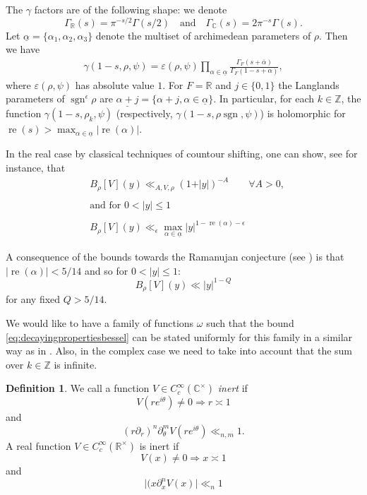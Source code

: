 \documentclass[a4paper,11pt]{amsart}
\theoremstyle{definition}
\newtheorem{definition}[theorem]{Definition}
\newcommand{\R}{\mathbb{R}}
\newcommand{\Z}{\mathbb{Z}}
\newcommand{\real}{\operatorname{re}}
\newcommand{\CC}{\mathbb{C}}
\begin{document}
The $\gamma$ factors are of the following shape: we denote $$\Gamma_{\R}(s) = \pi^{-s/2}\Gamma(s/2)\quad \text{and}\quad \Gamma_{\CC}(s) = 2\pi^{-s}\Gamma(s).$$ Let $\underline{\alpha}=\{\alpha_1,\alpha_2,\alpha_3\}$ denote the multiset of archimedean parameters of $\rho$. Then we have
\begin{align*}\gamma(1-s,\rho,\psi)=\varepsilon(\rho,\psi)\prod_{\alpha \in \underline{\alpha}}\frac{\Gamma_{F}(s+\overline{\alpha})}{\Gamma_{F}(1-s+\alpha)},\end{align*}
where $\varepsilon(\rho,\psi)$ has absolute value $1$. For $F=\R$ and $j\in \{0,1\}$
the Langlands parameters of $\operatorname{sgn}^\epsilon\rho$ are $\underline{\alpha+j} =\{\alpha+j, \alpha \in \underline{\alpha}\}$.
In particular, for each $k\in \Z$, the function $\gamma(1-s,\rho_k,\psi)$ (respectively, $\gamma(1-s,\rho\operatorname{sgn},\psi)$) is holomorphic for $\real(s)>\max_{\alpha \in \underline{\alpha}}\vert{\real(\alpha)}\vert$.




In the real case by classical techniques of countour shifting, one can show, see \cite[Prosposition 3.5]{kowalski2014fourier} for instance, that \begin{align}\label{eq:decayingpropertiesbessel}     &B_{\rho}[V](y) \ll_{A,V,\rho} (1+\vert{y}\vert)^{-A}\qquad \forall A>0, \nonumber\\ \\&\text{and for } 0< \vert{y}\vert \leq 1\nonumber\\ \nonumber\\&B_{\rho}[V](y) \ll_{\epsilon} \max_{\alpha \in \underline{\alpha}}\vert{y}\vert^{1-\real(\alpha)-\epsilon}\nonumber\end{align}


A consequence of the bounds towards the Ramanujan conjecture (see \cite{ramanujannumberfield}) is that $\vert{\real(\alpha)}\vert < 5/14$ and so for $0<\vert{y}\vert \leq 1$:
\[B_{\rho}[V](y) \ll \vert{y}\vert^{1-Q}\]
for any fixed $Q>5/14$.


We would like to have a family of functions $\omega$ such that the bound \eqref{eq:decayingpropertiesbessel} can be stated uniformly for this family in a similar way as in \cite{nelsonholowinsky}. Also, in the complex case we need to take into account that the sum over $k\in \Z$ is infinite. 




\begin{definition}\label{def:inert}
    We call a function $V\in C_c^{\infty}(\mathbb{C}^{\times})$ \emph{inert} if \[V(re^{i\theta}) \neq 0 \Rightarrow r \asymp 1\] and\begin{equation}\label{eq:inert}(r\partial_r)^n\partial_{\theta}^mV(re^{i\theta}) \ll_{n,m} 1.\end{equation}
A real function $V\in C_c^{\infty}(\R^{\times})$ is inert if 
\[V(x) \neq 0 \Rightarrow x \asymp 1\]
and \begin{equation*}
    \vert{(x\partial_x^nV(x)}\vert \ll_n 1
\end{equation*}
\end{definition} 
\end{document}
